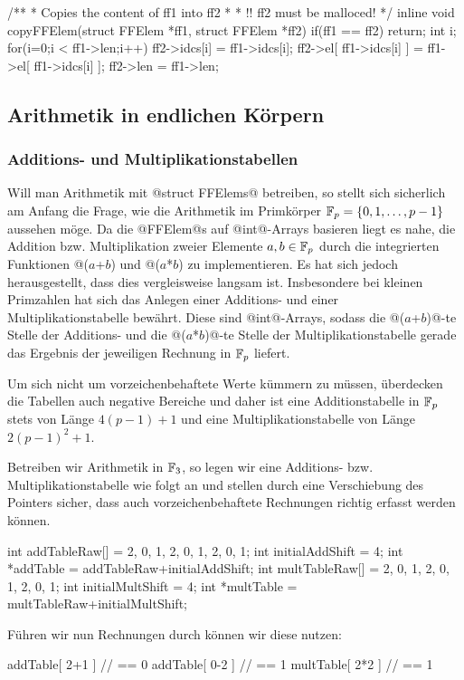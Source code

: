 \begin{ccode}[caption={Aus \url{../Sage/enumeratePCNs.c}},
  firstnumber=50]
/**
 * Copies the content of ff1 into ff2
 *
 * !! ff2 must be malloced!
 */
inline void copyFFElem(struct FFElem *ff1, struct FFElem *ff2){
    if(ff1 == ff2) return;
    int i;
    for(i=0;i < ff1->len;i++){
        ff2->idcs[i] = ff1->idcs[i];
        ff2->el[ ff1->idcs[i] ] = ff1->el[ ff1->idcs[i] ];
    }
    ff2->len = ff1->len;
}
\end{ccode}

\subsection{Arithmetik in endlichen Körpern}
\label{sub:arithmetik_in_endlichen_körpern}


\subsubsection{Additions- und Multiplikationstabellen}
Will man Arithmetik mit @struct FFElems@ betreiben, so stellt sich sicherlich
am Anfang die Frage, wie die Arithmetik im Primkörper 
$\mathbb{F}_p = \{0,1,\ldots,p-1\}$
aussehen möge. Da
die @FFElem@s auf @int@-Arrays basieren liegt es nahe, die Addition bzw.
Multiplikation zweier Elemente $a,b\in \mathbb{F}_p$ durch die integrierten Funktionen
@($a$+$b$) %
und @($a$*$b$) %
zu implementieren. Es hat sich jedoch herausgestellt, dass dies vergleisweise
langsam ist. Insbesondere bei kleinen Primzahlen hat sich das Anlegen einer
Additions- und einer Multiplikationstabelle bewährt. Diese sind @int@-Arrays,
sodass die @($a$+$b$)@-te Stelle der Additions- und die 
@($a$*$b$)@-te Stelle der Multiplikationstabelle gerade das Ergebnis der
jeweiligen Rechnung in $\mathbb{F}_p$ liefert.

\begin{bemerkung}
  Um sich nicht um vorzeichenbehaftete Werte kümmern zu müssen, überdecken die
  Tabellen auch negative Bereiche und daher ist eine Additionstabelle in $\mathbb{F}_p$
  stets von Länge $4(p-1)+1$ und eine Multiplikationstabelle von
  Länge $2(p-1)^2+1$.
\end{bemerkung}

\begin{beispiel}
  Betreiben wir Arithmetik in $\mathbb{F}_3$, so legen wir eine Additions- bzw.
  Multiplikationstabelle wie folgt an und stellen durch eine Verschiebung des
  Pointers sicher, dass auch vorzeichenbehaftete Rechnungen richtig erfasst
  werden können.
  \begin{cexample}
    int addTableRaw[] = {2, 0, 1, 2, 0, 1, 2, 0, 1};
    int initialAddShift = 4;
    int *addTable = addTableRaw+initialAddShift;
    int multTableRaw[] = {2, 0, 1, 2, 0, 1, 2, 0, 1};
    int initialMultShift = 4;
    int *multTable = multTableRaw+initialMultShift;
  \end{cexample}
  Führen wir nun Rechnungen durch können wir diese nutzen:
  \begin{cexample}
    addTable[ 2+1 ]  // == 0 
    addTable[ 0-2 ]  // == 1
    multTable[ 2*2 ]  // == 1
  \end{cexample}
\end{beispiel}


